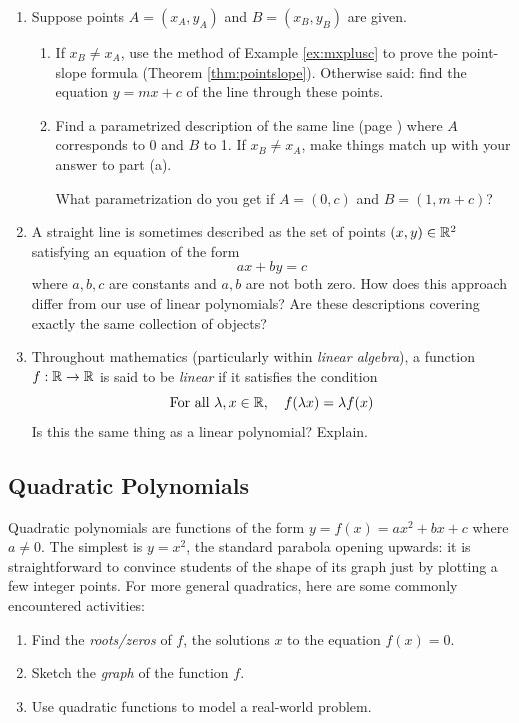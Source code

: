 \begin{exercises}{}{}
\begin{enumerate}
    
    \item\label{exs:lineparam}
    Suppose points $A=(x_A,y_A)$ and $B=(x_B,y_B)$ are given. 
    \begin{enumerate}
      \item If $x_B\neq x_A$, use the method of Example \ref{ex:mxplusc} to prove the point-slope formula (Theorem \ref{thm:pointslope}). Otherwise said: find the equation $y=mx+c$ of the line through these points.
      
      \item Find a parametrized description of the same line (page \pageref{pg:paramline}) where $A$ corresponds to 0 and $B$ to 1. If $x_B\neq x_A$, make things match up with your answer to part (a).\par
      What parametrization do you get if $A=(0,c)$ and $B=(1,m+c)$?
    \end{enumerate}
        
    
    \item A straight line is sometimes described as the set of points $(x,y)\in\mathbb{R}^2$ satisfying an equation of the form
    \[
    	ax+by=c
    \]
    where $a,b,c$ are constants and $a,b$ are not both zero. How does this approach differ from our use of linear polynomials? Are these descriptions covering exactly the same collection of objects?
    
    
    \item Throughout mathematics (particularly within \emph{linear algebra}), a function $f:\mathbb{R}\to\mathbb{R}$ is said to be \emph{linear} if it satisfies the condition
    \[
    	\text{For all }\lambda,x\in\mathbb{R},\quad f(\lambda x)=\lambda f(x)
    \]
    Is this the same thing as a linear polynomial? Explain.
   
  \end{enumerate}
\end{exercises}



\clearpage



\subsection{Quadratic Polynomials}

Quadratic polynomials are functions of the form $y=f(x)=ax^2+bx+c$ where $a\neq 0$. The simplest is $y=x^2$, the standard parabola opening upwards: it is straightforward to convince students of the shape of its graph just by plotting a few integer points. For more general quadratics, here are some commonly encountered activities:
\begin{enumerate}
  \item Find the \emph{roots/zeros} of $f$, the solutions $x$ to the equation $f(x)=0$.
  \item Sketch the \emph{graph} of the function $f$.
  \item Use quadratic functions to model a real-world problem.
\end{enumerate}

